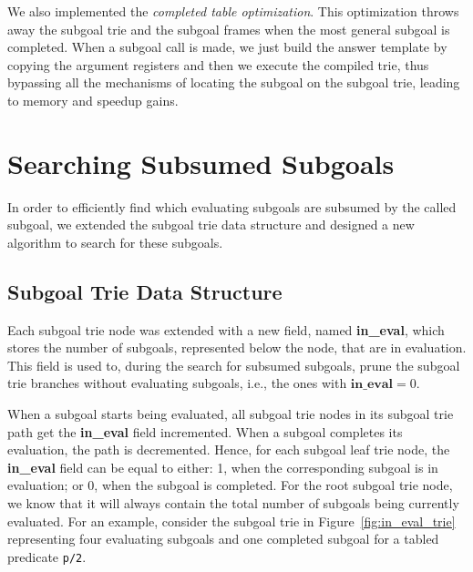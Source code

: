 We also implemented the \textit{completed table optimization}. This optimization throws
away the subgoal trie and the subgoal frames when the most general subgoal is completed.
When a subgoal call is made, we just build the answer template by copying the argument
registers and then we execute the compiled trie, thus bypassing all the mechanisms of
locating the subgoal on the subgoal trie, leading to memory and speedup gains. 

\section{Searching Subsumed Subgoals}\label{sec:searching_subsumed}

In order to efficiently find which evaluating subgoals are subsumed
by the called subgoal, we extended the subgoal trie data structure and designed a new
algorithm to search for these subgoals.

\subsection{Subgoal Trie Data Structure}

Each subgoal trie node was extended with a new field, named
\textbf{in\_eval}, which stores the number of subgoals, represented below the
node, that are in evaluation. This field is used to, during the search
for subsumed subgoals, prune the subgoal trie branches without
evaluating subgoals, i.e., the ones with $\textbf{in\_eval} = 0$.

When a subgoal starts being evaluated, all subgoal trie nodes in its
subgoal trie path get the \textbf{in\_eval} field incremented. When a subgoal
completes its evaluation, the path is decremented. Hence, for each
subgoal leaf trie node, the \textbf{in\_eval} field can be equal to either:
1, when the corresponding subgoal is in evaluation; or 0, when the
subgoal is completed. For the root subgoal trie node, we know that it
will always contain the total number of subgoals being currently
evaluated. For an example, consider the subgoal trie in
Figure~\ref{fig:in_eval_trie} representing four evaluating subgoals and
one completed subgoal for a tabled predicate \texttt{p/2}.

